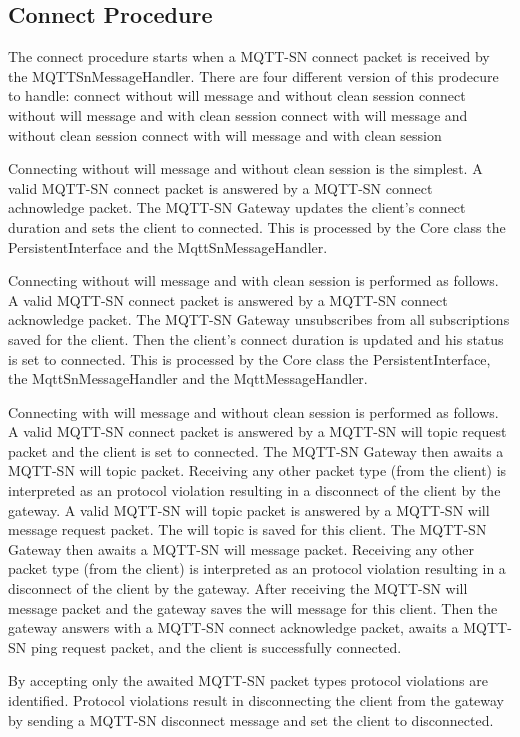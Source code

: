 \subsection{Connect Procedure}
The connect procedure starts when a MQTT-SN connect packet is received by the MQTTSnMessageHandler.
There are four different version of this prodecure to handle:
connect without will message and without clean session
connect without will message and with clean session
connect with will message and without clean session
connect with will message and with clean session

Connecting without will message and without clean session is the simplest.
A valid MQTT-SN connect packet is answered by a MQTT-SN connect achnowledge packet.
The MQTT-SN Gateway updates the client's connect duration and sets the client to connected.
This is processed by the Core class the PersistentInterface and the MqttSnMessageHandler.

Connecting without will message and with clean session is performed as follows.
A valid MQTT-SN connect packet is answered by a MQTT-SN connect acknowledge packet.
The MQTT-SN Gateway unsubscribes from all subscriptions saved for the client.
Then the client's connect duration is updated and his status is set to connected.
This is processed by the Core class the PersistentInterface, the MqttSnMessageHandler and the MqttMessageHandler.

Connecting with will message and without clean session is performed as follows.
A valid MQTT-SN connect packet is answered by a MQTT-SN will topic request packet and the client is set to connected.
The MQTT-SN Gateway then awaits a MQTT-SN will topic packet.
Receiving any other packet type (from the client) is interpreted as an protocol violation resulting in a disconnect of the client by the gateway.
A valid MQTT-SN will topic packet is answered by a MQTT-SN will message request packet.
The will topic is saved for this client.
The MQTT-SN Gateway then awaits a MQTT-SN will message packet.
Receiving any other packet type (from the client) is interpreted as an protocol violation resulting in a disconnect of the client by the gateway.
After receiving the MQTT-SN will message packet and the gateway saves the will message for this client.
Then the gateway answers with a MQTT-SN connect acknowledge packet, awaits a MQTT-SN ping request packet, and the client is successfully connected.

By accepting only the awaited MQTT-SN packet types protocol violations are identified.
Protocol violations result in disconnecting the client from the gateway by sending a MQTT-SN disconnect message and set the client to disconnected.

